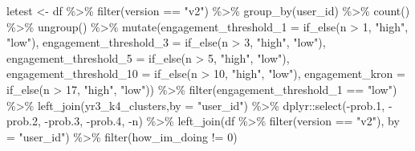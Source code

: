\documentclass[
]{article}
\newenvironment{Shaded}{\begin{snugshade}}{\end{snugshade}}
\newcommand{\AttributeTok}[1]{\textcolor[rgb]{0.77,0.63,0.00}{#1}}
\newcommand{\DecValTok}[1]{\textcolor[rgb]{0.00,0.00,0.81}{#1}}
\newcommand{\FloatTok}[1]{\textcolor[rgb]{0.00,0.00,0.81}{#1}}
\newcommand{\FunctionTok}[1]{\textcolor[rgb]{0.00,0.00,0.00}{#1}}
\newcommand{\NormalTok}[1]{#1}
\newcommand{\OtherTok}[1]{\textcolor[rgb]{0.56,0.35,0.01}{#1}}
\newcommand{\SpecialCharTok}[1]{\textcolor[rgb]{0.00,0.00,0.00}{#1}}
\newcommand{\StringTok}[1]{\textcolor[rgb]{0.31,0.60,0.02}{#1}}
\begin{document}
\begin{Shaded}
\begin{Highlighting}[]
\NormalTok{letest }\OtherTok{\textless{}{-}}\NormalTok{  df }\SpecialCharTok{\%\textgreater{}\%}
  \FunctionTok{filter}\NormalTok{(version }\SpecialCharTok{==} \StringTok{"v2"}\NormalTok{) }\SpecialCharTok{\%\textgreater{}\%}
  \FunctionTok{group\_by}\NormalTok{(user\_id) }\SpecialCharTok{\%\textgreater{}\%}
  \FunctionTok{count}\NormalTok{() }\SpecialCharTok{\%\textgreater{}\%}
  \FunctionTok{ungroup}\NormalTok{() }\SpecialCharTok{\%\textgreater{}\%} 
  \FunctionTok{mutate}\NormalTok{(}\AttributeTok{engagement\_threshold\_1 =} \FunctionTok{if\_else}\NormalTok{(n }\SpecialCharTok{\textgreater{}} \DecValTok{1}\NormalTok{, }\StringTok{"high"}\NormalTok{, }\StringTok{"low"}\NormalTok{),}
         \AttributeTok{engagement\_threshold\_3 =} \FunctionTok{if\_else}\NormalTok{(n }\SpecialCharTok{\textgreater{}} \DecValTok{3}\NormalTok{, }\StringTok{"high"}\NormalTok{, }\StringTok{"low"}\NormalTok{),}
         \AttributeTok{engagement\_threshold\_5 =} \FunctionTok{if\_else}\NormalTok{(n }\SpecialCharTok{\textgreater{}} \DecValTok{5}\NormalTok{, }\StringTok{"high"}\NormalTok{, }\StringTok{"low"}\NormalTok{),}
         \AttributeTok{engagement\_threshold\_10 =} \FunctionTok{if\_else}\NormalTok{(n }\SpecialCharTok{\textgreater{}} \DecValTok{10}\NormalTok{, }\StringTok{"high"}\NormalTok{, }\StringTok{"low"}\NormalTok{),}
         \AttributeTok{engagement\_kron =} \FunctionTok{if\_else}\NormalTok{(n }\SpecialCharTok{\textgreater{}} \DecValTok{17}\NormalTok{, }\StringTok{"high"}\NormalTok{, }\StringTok{"low"}\NormalTok{)) }\SpecialCharTok{\%\textgreater{}\%} 
  \FunctionTok{filter}\NormalTok{(engagement\_threshold\_1 }\SpecialCharTok{==} \StringTok{"low"}\NormalTok{) }\SpecialCharTok{\%\textgreater{}\%} 
  \FunctionTok{left\_join}\NormalTok{(yr3\_k4\_clusters,}\AttributeTok{by =} \StringTok{"user\_id"}\NormalTok{) }\SpecialCharTok{\%\textgreater{}\%} 
\NormalTok{  dplyr}\SpecialCharTok{::}\FunctionTok{select}\NormalTok{(}\SpecialCharTok{{-}}\NormalTok{prob}\FloatTok{.1}\NormalTok{,}
          \SpecialCharTok{{-}}\NormalTok{prob}\FloatTok{.2}\NormalTok{,}
          \SpecialCharTok{{-}}\NormalTok{prob}\FloatTok{.3}\NormalTok{,}
          \SpecialCharTok{{-}}\NormalTok{prob}\FloatTok{.4}\NormalTok{,}
          \SpecialCharTok{{-}}\NormalTok{n) }\SpecialCharTok{\%\textgreater{}\%} 
  \FunctionTok{left\_join}\NormalTok{(df }\SpecialCharTok{\%\textgreater{}\%} 
  \FunctionTok{filter}\NormalTok{(version }\SpecialCharTok{==} \StringTok{"v2"}\NormalTok{),}
         \AttributeTok{by =} \StringTok{"user\_id"}\NormalTok{) }\SpecialCharTok{\%\textgreater{}\%}
  \FunctionTok{filter}\NormalTok{(how\_im\_doing }\SpecialCharTok{!=} \DecValTok{0}\NormalTok{)}



\end{Highlighting}
\end{Shaded}
\end{document}
